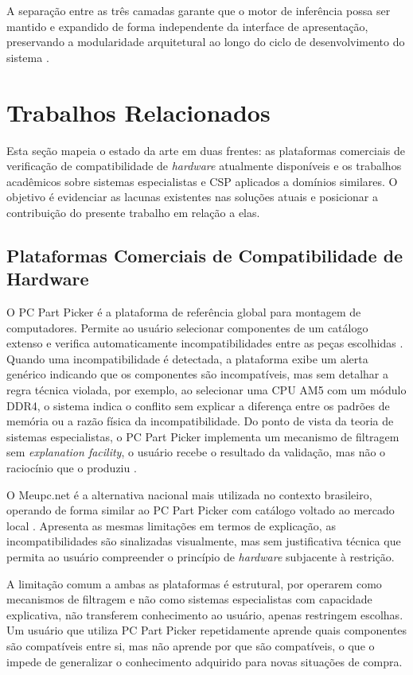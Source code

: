 A separação entre as três camadas garante que o motor de inferência possa ser
mantido e expandido de forma independente da interface de apresentação,
preservando a modularidade arquitetural ao longo do ciclo de desenvolvimento
do sistema \cite{Fowler2002,Fielding2000}.

\section{Trabalhos Relacionados}
Esta seção mapeia o estado da arte em duas frentes: as plataformas comerciais de verificação de compatibilidade
de \textit{hardware} atualmente disponíveis e os trabalhos acadêmicos sobre sistemas especialistas e CSP aplicados
a domínios similares. O objetivo é evidenciar as lacunas existentes nas soluções atuais e posicionar a contribuição do
presente trabalho em relação a elas.

\subsection{Plataformas Comerciais de Compatibilidade de Hardware}
O PC Part Picker é a plataforma de referência global para montagem de computadores. Permite ao usuário
selecionar componentes de um catálogo extenso e verifica automaticamente incompatibilidades entre as peças
escolhidas \cite{PCPARTPICKER2024}. Quando uma incompatibilidade é detectada, a plataforma exibe um alerta
genérico indicando que os componentes são incompatíveis, mas sem detalhar a regra técnica violada, por exemplo, ao selecionar uma
CPU AM5 com um módulo DDR4, o sistema indica o conflito sem explicar a diferença entre os padrões de memória
ou a razão física da incompatibilidade. Do ponto de vista da teoria de sistemas especialistas, o PC Part Picker
implementa um mecanismo de filtragem sem \textit{explanation facility}, o usuário recebe o resultado da
validação, mas não o raciocínio que o produziu \cite{Clancey1983}.

O Meupc.net é a alternativa nacional mais utilizada no contexto brasileiro, operando de forma similar
ao PC Part Picker com catálogo voltado ao mercado local \cite{MEUPC2024}. Apresenta as mesmas limitações
em termos de explicação, as incompatibilidades são sinalizadas visualmente, mas sem justificativa técnica que
permita ao usuário compreender o princípio de \textit{hardware} subjacente à restrição.

A limitação comum a ambas as plataformas é estrutural, por operarem como mecanismos de filtragem e não
como sistemas especialistas com capacidade explicativa, não transferem conhecimento ao usuário, apenas
restringem escolhas. Um usuário que utiliza PC Part Picker repetidamente aprende quais componentes são
compatíveis entre si, mas não aprende por que são compatíveis, o que o impede de generalizar
o conhecimento adquirido para novas situações de compra.

